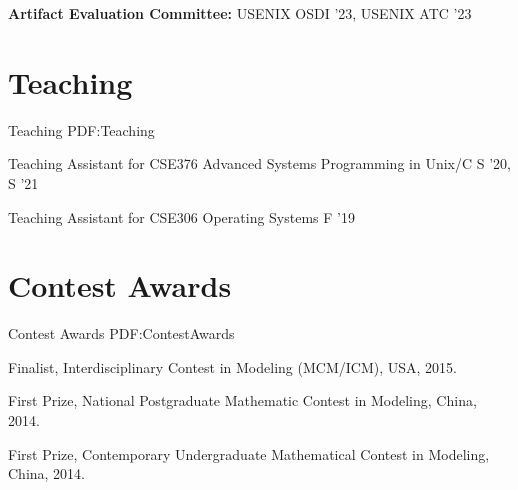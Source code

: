 \documentclass[a4paper,10pt,oneside]{article}
\newcommand{\CVNote}{CV updated on {\DatestampYM{2024}{08}} }
\begin{document}
\begin{body}

\textbf{Artifact Evaluation Committee:}
USENIX OSDI '23, USENIX ATC '23


\section
{Teaching}
{Teaching}
{PDF:Teaching}

Teaching Assistant for CSE376 Advanced Systems Programming in Unix/C 
\hfill
S '20, S '21

Teaching Assistant for CSE306 Operating Systems 
\hfill
F '19


\section
{Contest Awards}
{Contest Awards}
{PDF:ContestAwards}

\BulletItem
Finalist, Interdisciplinary Contest in Modeling (MCM/ICM), USA, 2015.

\BulletItem
First Prize, National Postgraduate Mathematic Contest in Modeling, China, 2014.

\BulletItem
First Prize, Contemporary Undergraduate Mathematical Contest in Modeling, China, 2014.










\end{body}


\label{LastPage}~
\end{document}
